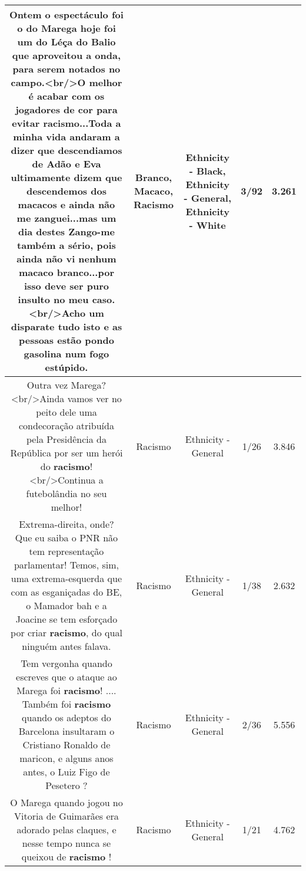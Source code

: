 \documentclass[11pt]{article}
\newlength\mylength
\begin{document}
\begin{center}
\begin{longtable}{|C{.65\mylength}|C{.30\mylength}|C{.12\mylength}|C{.12\mylength}|C{.12\mylength}|}
  \small Ontem o espectáculo foi o do Marega hoje foi um do Léça do Balio que aproveitou a onda, para serem notados no campo.<br/>O melhor é acabar com os jogadores de cor para evitar \textbf{racismo}...Toda a minha vida andaram a dizer que descendiamos de Adão e Eva ultimamente dizem que descendemos dos macacos e ainda não me zanguei...mas um dia destes Zango-me também a sério, pois ainda não vi nenhum \textbf{macaco} \textbf{branco}...por isso deve ser puro insulto no meu caso.<br/>Acho um disparate tudo isto e as pessoas estão pondo gasolina num fogo estúpido.\normalsize   & Branco, Macaco, Racismo & Ethnicity - Black, Ethnicity - General, Ethnicity - White & 3/92 & 3.261 \\  \hline
  \small Outra vez Marega?<br/>Ainda vamos ver no peito dele uma condecoração atribuída pela Presidência da República por ser um herói do \textbf{racismo}!<br/>Continua a futebolândia no seu melhor!\normalsize   & Racismo & Ethnicity - General & 1/26 & 3.846 \\  \hline
  \small Extrema-direita, onde? Que eu saiba o PNR não tem representação parlamentar! Temos, sim, uma extrema-esquerda que com as esganiçadas do BE, o Mamador bah e a Joacine se tem esforçado por criar \textbf{racismo}, do qual ninguém antes falava.\normalsize   & Racismo & Ethnicity - General & 1/38 & 2.632 \\  \hline
  \small Tem vergonha quando escreves que o ataque ao Marega foi \textbf{racismo}! .... Também foi \textbf{racismo} quando os adeptos do Barcelona insultaram o Cristiano Ronaldo de maricon, e alguns anos antes, o Luiz Figo de Pesetero ?\normalsize   & Racismo & Ethnicity - General & 2/36 & 5.556 \\  \hline
  \small O Marega quando jogou no Vitoria de Guimarães era adorado pelas claques, e nesse tempo nunca se queixou de \textbf{racismo} !\normalsize   & Racismo & Ethnicity - General & 1/21 & 4.762 \\  \hline

\end{longtable}
\end{center}
\end{document}
